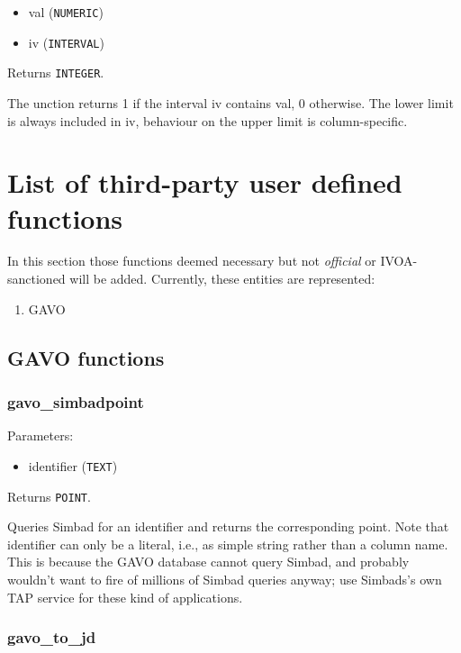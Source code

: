 \documentclass[11pt,a4paper]{ivoa}
\begin{document}
\begin{itemize}
	\item val (\texttt{NUMERIC})
	\item iv (\texttt{INTERVAL})
\end{itemize}

Returns \texttt{INTEGER}.

The unction returns 1 if the interval iv contains val, 0 otherwise. The
lower limit is always included in iv, behaviour on the upper limit is
column-specific.

\section{List of third-party user defined functions}

In this section those functions deemed necessary but not
\textit{official} or IVOA-sanctioned will be added. Currently, these
entities are represented:

\begin{enumerate}
	\item GAVO
\end{enumerate}

\subsection{GAVO functions}

\subsubsection{gavo\_simbadpoint}

Parameters:

\begin{itemize}
	\item identifier (\texttt{TEXT})
\end{itemize}

Returns \texttt{POINT}.

Queries Simbad for an identifier and returns the corresponding point.
Note that identifier can only be a literal, i.e., as simple string
rather than a column name. This is because the GAVO database cannot
query Simbad, and probably wouldn't want to fire of millions of Simbad
queries anyway; use Simbads's own TAP service for these kind of
applications.

\subsubsection{gavo\_to\_jd}
\end{document}
